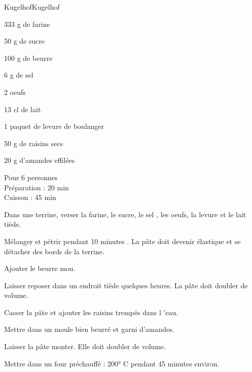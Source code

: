 \begin{recette}{Kugelhof}{Kugelhof}

\begin{ingredients}
333 g de farine\par
50 g de sucre\par
100 g de beurre\par
6 g de sel\par
2 oeufs\par
13 cl de lait\par
1 paquet de levure de boulanger\par
50 g  de raisins secs\par
20 g d’amandes effilées\par
\end{ingredients}

\begin{infos}
Pour 6 personnes\\
Préparation : 20 min\\
Cuisson : 45 min\\
\end{infos}

\begin{etapes}
\item Dans une terrine, verser la farine, le sucre, le sel , les oeufs, la levure et le lait tiède.
\item Mélanger et pétrir pendant 10 minutes . La pâte doit devenir élastique et se détacher des bords de la terrine.
\item Ajouter le beurre mou.
\item Laisser reposer dans un endroit tiède quelques heures. La pâte doit doubler de volume.
\item Casser la pâte et ajouter les raisins trempés dans l ’eau.
\item Mettre dans un moule bien beurré et garni d’amandes.
\item Laisser la pâte monter. Elle doit doubler de volume.
\item Mettre dans un four préchauffé : 200° C pendant 45 minutes environ.
\end{etapes}

\end{recette}